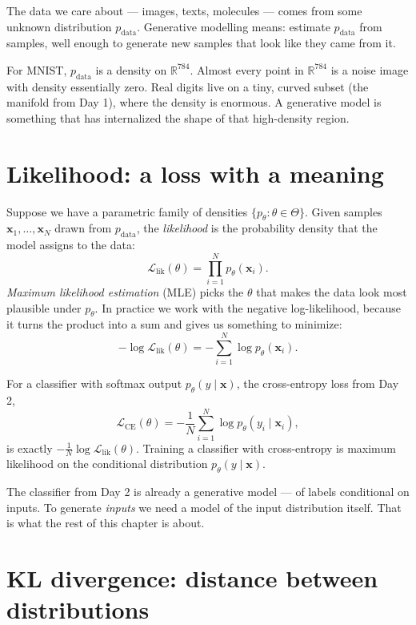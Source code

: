 The data we care about --- images, texts, molecules --- comes from some unknown distribution $p_{\text{data}}$. Generative modelling means: estimate $p_{\text{data}}$ from samples, well enough to generate new samples that look like they came from it.

\begin{intuition}
For MNIST, $p_{\text{data}}$ is a density on $\mathbb{R}^{784}$. Almost every point in $\mathbb{R}^{784}$ is a noise image with density essentially zero. Real digits live on a tiny, curved subset (the manifold from Day 1), where the density is enormous. A generative model is something that has internalized the shape of that high-density region.
\end{intuition}

\section{Likelihood: a loss with a meaning}

Suppose we have a parametric family of densities $\{p_\theta : \theta \in \Theta\}$. Given samples $\bm{x}_1, \ldots, \bm{x}_N$ drawn from $p_{\text{data}}$, the \emph{likelihood} is the probability density that the model assigns to the data:
\[
\mathcal{L}_{\text{lik}}(\theta) = \prod_{i=1}^N p_\theta(\bm{x}_i).
\]
\emph{Maximum likelihood estimation} (MLE) picks the $\theta$ that makes the data look most plausible under $p_\theta$. In practice we work with the negative log-likelihood, because it turns the product into a sum and gives us something to minimize:
\[
- \log \mathcal{L}_{\text{lik}}(\theta) = - \sum_{i=1}^N \log p_\theta(\bm{x}_i).
\]

\begin{proposition}
For a classifier with softmax output $p_\theta(y \mid \bm{x})$, the cross-entropy loss from Day 2,
\[
\mathcal{L}_{\text{CE}}(\theta) = - \frac{1}{N} \sum_{i=1}^N \log p_\theta(y_i \mid \bm{x}_i),
\]
is exactly $-\frac{1}{N} \log \mathcal{L}_{\text{lik}}(\theta)$. Training a classifier with cross-entropy is maximum likelihood on the conditional distribution $p_\theta(y \mid \bm{x})$.
\end{proposition}

The classifier from Day 2 is already a generative model --- of labels conditional on inputs. To generate \emph{inputs} we need a model of the input distribution itself. That is what the rest of this chapter is about.

\section{KL divergence: distance between distributions}

